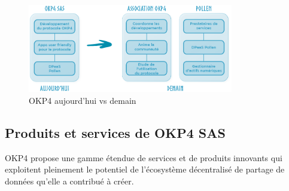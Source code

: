 \begin{figure}
    \centering
    \includegraphics[width=0.8\textwidth]{ILLUSTRATIONS/okp4_td_dm_bis_update.png}
    \caption{OKP4 aujourd'hui vs demain}
    \label{fig:okp4_today_tomorrow}
\end{figure}


\subsection{Produits et services de OKP4 SAS} \label{subsec:produits_okp4}


OKP4 propose une gamme étendue de services et de produits innovants qui exploitent pleinement le potentiel de l'écosystème décentralisé de partage de données qu'elle a contribué à créer.

